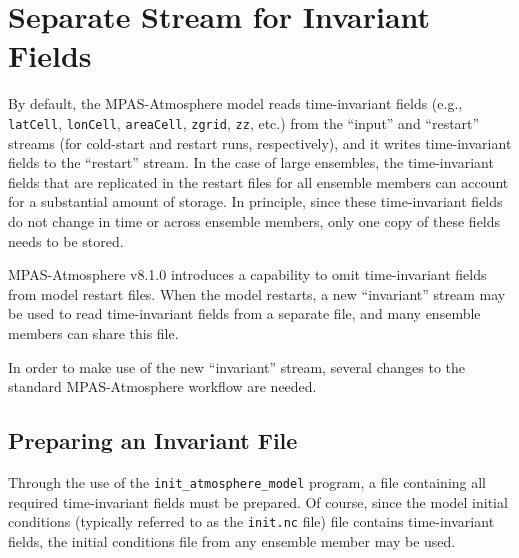 %
%
%
%
%


\section{Separate Stream for Invariant Fields}
\label{sec:invariant}

By default, the MPAS-Atmosphere model reads time-invariant fields (e.g., {\tt
latCell}, {\tt lonCell}, {\tt areaCell}, {\tt zgrid}, {\tt zz}, etc.) from the
``input'' and ``restart'' streams (for cold-start and restart runs, respectively),
and it writes time-invariant fields to the ``restart'' stream. In the case of
large ensembles, the time-invariant fields that are replicated in the restart
files for all ensemble members can account for a substantial amount of storage.
In principle, since these time-invariant fields do not change in time or across
ensemble members, only one copy of these fields needs to be stored.

MPAS-Atmosphere v8.1.0 introduces a capability to omit time-invariant fields
from model restart files. When the model restarts, a new ``invariant'' stream may
be used to read time-invariant fields from a separate file, and many ensemble
members can share this file.

In order to make use of the new ``invariant'' stream, several changes to the
standard MPAS-Atmosphere workflow are needed.

\subsection{Preparing an Invariant File}
\label{sec:invariant_file}

Through the use of the {\tt init\_atmosphere\_model} program, a file containing
all required time-invariant fields must be prepared. Of course, since the model
initial conditions (typically referred to as the {\tt init.nc} file) file
contains time-invariant fields, the initial conditions file from any ensemble
member may be used.

